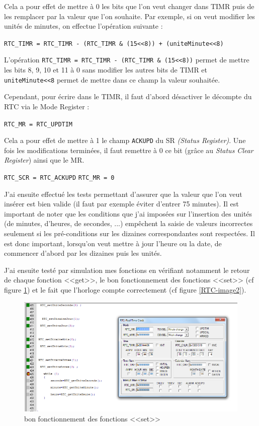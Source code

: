 \documentclass[a4paper]{report}
\begin{document}
Cela a pour effet de mettre à 0 les bits que l'on veut changer dans TIMR puis de les remplacer par la valeur que l'on souhaite.
Par exemple, si on veut modifier les unités de minutes, on effectue l'opération suivante :

\begin{center}
	\texttt{RTC\_TIMR = RTC\_TIMR - (RTC\_TIMR \& (15<<8)) + (uniteMinute<<8)}
\end{center}

L'opération \texttt{RTC\_TIMR = RTC\_TIMR - (RTC\_TIMR \& (15<<8))} permet de mettre les bits 8, 9, 10 et 11 à 0 sans modifier les autres bits de TIMR et \texttt{uniteMinute<<8} permet de mettre dans ce champ la valeur souhaitée.

Cependant, pour écrire dans le TIMR, il faut d'abord désactiver le décompte du RTC via le Mode Register :

\begin{center}
	\texttt{RTC\_MR = RTC\_UPDTIM}
\end{center}

Cela a pour effet de mettre à 1 le champ \texttt{ACKUPD} du SR \emph{(Status Register)}.
Une fois les modifications terminées, il faut remettre à 0 ce bit (grâce au \emph{Status Clear Register}) ainsi que le MR.

\begin{center}
	\texttt{RTC\_SCR = RTC\_ACKUPD}
	\texttt{RTC\_MR = 0}
\end{center}

J'ai ensuite effectué les tests permettant d'assurer que la valeur que l'on veut insérer est bien valide (il faut par exemple éviter d'entrer 75 minutes).
Il est important de noter que les conditions que j'ai imposées sur l'insertion des unités (de minutes, d'heures, de secondes, ...) empêchent la saisie de valeurs incorrectes seulement si les pré-conditions sur les dizaines correspondantes sont respectées.
Il est donc important, lorsqu'on veut mettre à jour l'heure ou la date, de commencer d'abord par les dizaines puis les unités.

J'ai ensuite testé par simulation mes fonctions en vérifiant notamment le retour de chaque fonction <<get>>, le bon fonctionnement des fonctions <<set>> (cf figure \ref{RTC-image1}) et le fait que l'horloge compte correctement (cf figure \ref{RTC-image2}).

\begin{figure}[h!]
	\centering
	\includegraphics[scale=0.4]{images/RTC_fig1.png}
	\caption{bon fonctionnement des fonctions <<set>>}
	\label{RTC-image1}
\end{figure}
\end{document}
